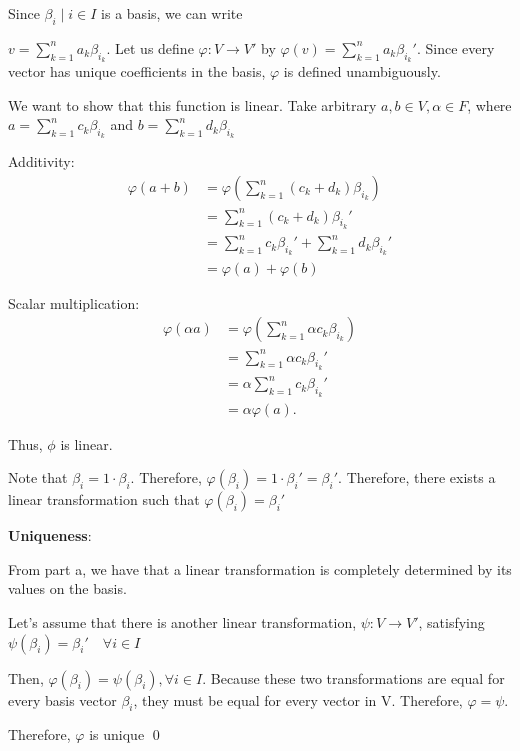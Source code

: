 \documentclass{article}
\begin{document}
\begin{problem}[30.24]
\begin{solution}
            Since ${\beta_i \mid i \in I}$ is a basis, we can write 

            $v = \sum_{k=1}^{n} a_k \beta_{i_k}$. Let us define $\varphi \colon V \to V'$ by $\varphi(v) = \sum_{k=1}^{n} a_k \beta_{i_k}'$. Since every vector has unique coefficients in the basis, $\varphi$ is defined unambiguously. 

            We want to show that this function is linear.  Take arbitrary $a, b \in V, \alpha \in F$, where $a = \sum_{k = 1}^{n} c_k \beta_{i_k}$ and $b=\sum_{k=1}^{n} d_k \beta_{i_k}$
            
            Additivity:
            \begin{align*}
                \varphi(a+b) &= \varphi(\sum_{k=1}^{n}(c_k + d_k)\beta_{i_k}) \\
                &= \sum_{k = 1}^{n}(c_k + d_k) \beta_{i_k}' \\
                &= \sum_{k = 1}^{n} c_k \beta_{i_k}' + \sum_{k = 1}^{n} d_k \beta_{i_k}' \\
                &= \varphi(a) + \varphi(b)
            \end{align*}
            
            Scalar multiplication: 
            \begin{align*}
                \varphi(\alpha a) &= \varphi\left(\sum_{k=1}^{n} \alpha c_k \beta_{i_k}\right) \\
                &= \sum_{k=1}^{n} \alpha c_k \beta_{i_k}' \\
                &= \alpha \sum_{k=1}^{n} c_k \beta_{i_k}' \\
                &= \alpha\varphi(a).
            \end{align*}

            Thus, $\phi$ is linear. 
            
            Note that $\beta_i = 1 \cdot \beta_i$. Therefore, 
            $\varphi(\beta_i) = 1 \cdot \beta_i' = \beta_i'$. Therefore, there exists a linear transformation such that $\varphi(\beta_i) = \beta_i'$
            \medskip

            \textbf{Uniqueness}: 

            From part a, we have that a linear transformation is completely determined by its values on the basis. 

            Let's assume that there is another linear transformation, $\psi \colon V \to V'$, satisfying $\psi(\beta_i) = \beta_i' \hspace{1em}\forall i \in I$

            Then, $\varphi(\beta_i) = \psi(\beta_i), \forall i \in I$. Because these two transformations are equal for every basis vector $\beta_i$, they must be equal for every vector in V. Therefore, $\varphi = \psi$. 
            
            Therefore, $\varphi$ is unique \qed   
        \end{solution}
\end{problem}
\end{document}
